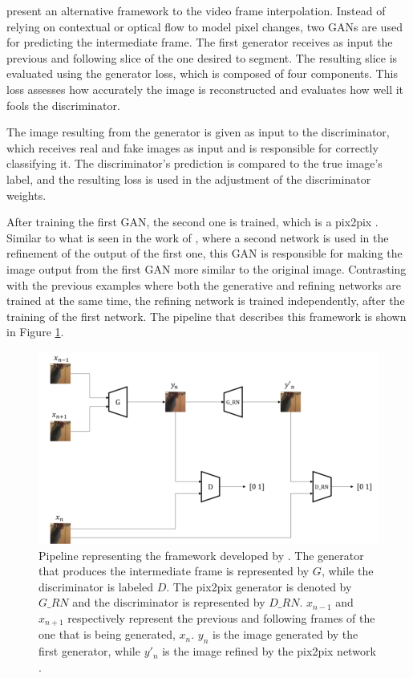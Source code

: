 \textcite{Tran2020} present an alternative framework to the video frame interpolation. Instead of relying on contextual or optical flow to model pixel changes, two GANs are used for predicting the intermediate frame. The first generator receives as input the previous and following slice of the one desired to segment. The resulting slice is evaluated using the generator loss, which is composed of four components. This loss assesses how accurately the image is reconstructed and evaluates how well it fools the discriminator.
\par
The image resulting from the generator is given as input to the discriminator, which receives real and fake images as input and is responsible for correctly classifying it. The discriminator's prediction is compared to the true image's label, and the resulting loss is used in the adjustment of the discriminator weights.
\par
After training the first GAN, the second one is trained, which is a pix2pix \parencite{Isola2017}. Similar to what is seen in the work of \textcite{Gambini2024, Huang2022}, where a second network is used in the refinement of the output of the first one, this GAN is responsible for making the image output from the first GAN more similar to the original image. Contrasting with the previous examples where both the generative and refining networks are trained at the same time, the refining network is trained independently, after the training of the first network. The pipeline that describes this framework is shown in Figure \ref{fig:VideoGANFramework}.

\begin{figure}[!ht]
	\centering
	\includegraphics[width=1.0\linewidth]{figures/VideoGANFramework}
	\caption{Pipeline representing the framework developed by \textcite{Tran2020}. The generator that produces the intermediate frame is represented by $G$, while the discriminator is labeled $D$. The pix2pix generator is denoted by $G\_RN$ and the discriminator is represented by $D\_RN$. $x_{n-1}$ and $x_{n+1}$ respectively represent the previous and following frames of the one that is being generated, $x_{n}$. $y_{n}$ is the image generated by the first generator, while $y'_{n}$ is the image refined by the pix2pix network \parencite{Tran2020}.}
	\label{fig:VideoGANFramework}
\end{figure}
